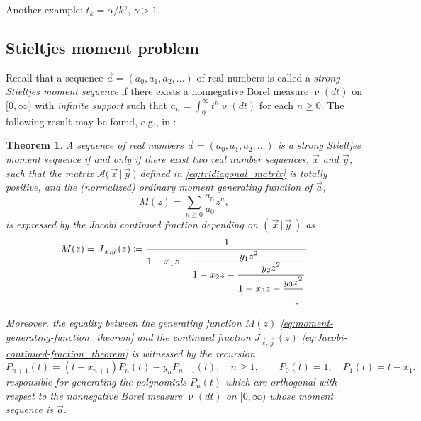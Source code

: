 \documentclass[letterpaper,11pt,oneside,reqno]{article}
\numberwithin{equation}{section}
\newtheorem{theorem}[proposition]{Theorem}
\theoremstyle{definition}
\begin{document}
Another example: $t_k=\alpha/k^\gamma$, $\gamma>1$.

\subsection{Stieltjes moment problem}


Recall that a sequence
$\vec{a}=(a_0, a_1, a_2, \dots)$ of real numbers is called a
\emph{strong Stieltjes moment
sequence} if there exists a nonnegative Borel measure $\upnu(dt)$ on $[0,\infty)$
with \emph{infinite support} such that
$a_n = \int_0^\infty t^n  \upnu(dt)$ for each $n \geq 0$.
The following result may be found, e.g.,
in
\cite{sokal2020euler}:

\begin{theorem}
\label{thm:stieltjes-moments-theorem}
A sequence of real numbers $\vec{a} = (a_0, a_1, a_2, \dots)$ is a strong Stieltjes moment sequence if and only if there exist two real number sequences, $\vec{x}$ and $\vec{y}$, such that the matrix $\mathcal{A} \big( \, \vec{x} \, | \, \vec{y} \, \big)$ defined in \eqref{eq:tridiagonal_matrix} is totally positive, and the (normalized) ordinary moment generating function of $\vec a$,
\begin{equation}
	\label{eq:moment-generating-function_theorem}
	M(z) = \sum_{n \geq 0} \frac{a_n}{a_0} z^n,
\end{equation}
is expressed by the Jacobi continued fraction
depending on $( \, \vec{x} \, | \, \vec{y} \, )$ as
\begin{equation}
	\label{eq:Jacobi-continued-fraction_theorem}
	M(z)=
	J_{\, \vec{x}, \vec{y}} \,(z) \coloneqq
{1 \over {1 - x_1z - {\displaystyle y_1z^2 \over {\displaystyle 1 - x_2 z - {\displaystyle y_2z^2 \over
{\displaystyle 1 - x_3 z - {\displaystyle y_3z^2 \over {\ddots } } } } } } } }
\end{equation}

Moreover,
the equality between the
generating function $M(z)$ \eqref{eq:moment-generating-function_theorem}
and the continued fraction
$J_{\, \vec{x}, \vec{y}} \,(z)$ \eqref{eq:Jacobi-continued-fraction_theorem}
is witnessed by the recursion
\begin{equation*}
	P_{n+1}(t) = (t - x_{n+1})P_n(t) - y_n P_{n-1}(t),
	\quad n \geq 1,
	\qquad
	P_0(t) = 1, \quad P_1(t) = t - x_1.
\end{equation*}
responsible for generating the polynomials
$P_n(t)$ which are orthogonal with respect to the nonnegative
Borel measure $\upnu(dt)$
on $[0,\infty)$ whose moment sequence is
$\vec{a}$.
\end{theorem}
\end{document}
